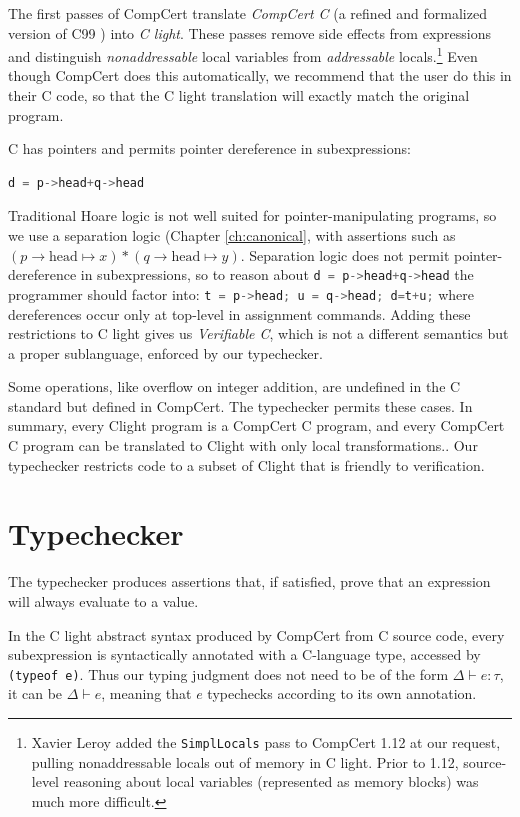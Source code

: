 \documentclass{puthesis}
\begin{document}
The first passes of CompCert translate \emph{CompCert C} (a refined
and formalized version of C99 \cite{Compcert-compiler-website}) into
\emph{C light}.  These passes remove side effects from expressions and
distinguish \emph{nonaddressable} local variables from
\emph{addressable} locals.\footnote{Xavier Leroy added the
  \lstinline|SimplLocals| pass to CompCert 1.12 at our request,
  pulling nonaddressable locals out of memory in C light.  Prior to
  1.12, source-level reasoning about local variables (represented as
  memory blocks) was much more difficult.}  Even though CompCert does
this automatically, we recommend that the user do this in their C
code, so that the C light translation will exactly match the original
program.

C has pointers and permits pointer dereference in subexpressions: 
\begin{lstlisting}[language=C]
d = p->head+q->head
\end{lstlisting}

Traditional Hoare logic is not well suited for pointer-manipulating programs,
so we use a separation logic (Chapter \ref{ch:canonical}, with assertions such as 
$(p\!\!\rightarrow \! \! \mathrm{head} \mapsto x) *(q \!\! \rightarrow \! \!
\mathrm{head} \mapsto y)$. Separation logic does not permit pointer-dereference
in subexpressions, so to reason about 
\lstinline[language=C]|d = p->head+q->head| 
the programmer should factor into:
\lstinline[language=c]|t = p->head; u = q->head; d=t+u;|
where dereferences occur only at top-level in assignment commands.
Adding these restrictions to C light gives us \emph{Verifiable C}, which is not
a different semantics but a proper sublanguage, enforced by our typechecker.


Some operations, like overflow on integer addition, are undefined in
the C standard but defined in CompCert. The typechecker
permits these cases. In summary, every Clight program is a CompCert C
program, and every CompCert C program can be translated to Clight with
only local transformations.. Our typechecker restricts code to a
subset of Clight that is friendly to verification.

\section{Typechecker} 
\label{sec:typechecker}
The typechecker produces assertions that, if satisfied, prove that an
expression will always evaluate to a value.  

In the C light abstract syntax produced by CompCert from C source code,
every subexpression is syntactically annotated
with a C-language type, accessed by \lstinline{(typeof e)}. 
Thus our typing judgment does not need to be of the
form $\Delta \vdash e : \tau$, it can be
$\Delta \vdash e $, meaning that $e$ typechecks according to its
own annotation.
\end{document}
